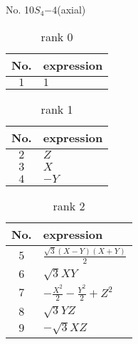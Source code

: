 \documentclass[fleqn,8pt,landscape]{jsarticle}
\begin{document}
\setcounter{MaxMatrixCols}{16}

\begin{center}
\LARGE
No. 10\quad$S_{4}$\quad$-4$\quad[ tetragonal ] (axial)
\end{center}
\begin{table}[ht!]
\begin{center}
\caption{rank 0}
\renewcommand{\arraystretch}{1.3}
\begin{tabular}{cl} \hline \hline
No. & expression \\ \hline
$ 1 $ & $ 1 $ \\
 \hline \hline
\end{tabular}
\end{center}
\end{table}
\begin{table}[ht!]
\begin{center}
\caption{rank 1}
\renewcommand{\arraystretch}{1.3}
\begin{tabular}{cl} \hline \hline
No. & expression \\ \hline
$ 2 $ & $ Z $ \\
$ 3 $ & $ X $ \\
$ 4 $ & $ - Y $ \\
 \hline \hline
\end{tabular}
\end{center}
\end{table}
\begin{table}[ht!]
\begin{center}
\caption{rank 2}
\renewcommand{\arraystretch}{1.3}
\begin{tabular}{cl} \hline \hline
No. & expression \\ \hline
$ 5 $ & $ \frac{\sqrt{3} \left(X - Y\right) \left(X + Y\right)}{2} $ \\
$ 6 $ & $ \sqrt{3} X Y $ \\
$ 7 $ & $ - \frac{X^{2}}{2} - \frac{Y^{2}}{2} + Z^{2} $ \\
$ 8 $ & $ \sqrt{3} Y Z $ \\
$ 9 $ & $ - \sqrt{3} X Z $ \\
 \hline \hline
\end{tabular}
\end{center}
\end{table}
\end{document}
